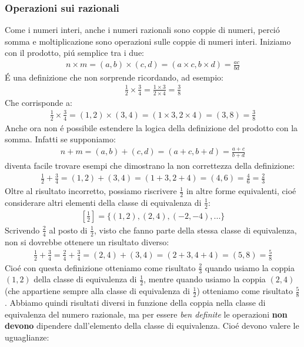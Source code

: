 \documentclass[twoside]{article} %
\begin{document}
	\subsubsection{Operazioni sui razionali}
		Come i numeri interi, anche i numeri razionali sono coppie di numeri, perci\'o   somma e moltiplicazione sono operazioni sulle coppie di numeri  interi. Iniziamo con il prodotto, pi\'u semplice tra i due:
		\begin{gather*}
			n\times m= (a,b)\times (c,d)=(a\times c,b\times d)= \frac{ac}{bd}
		\end{gather*}
		\'E una definizione che non sorprende ricordando, ad esempio:
		\begin{gather*}
			\frac{1}{2}\times \frac{3}{4}=\frac{1\times 3}{2\times 4}=\frac{3}{8}
		\end{gather*}
		Che corrisponde a:
		\begin{gather*}
			\frac{1}{2}\times \frac{3}{4}= (1,2)\times (3,4)=(1\times 3,2\times 4)=(3,8)=\frac{3}{8}
		\end{gather*}
		Anche ora non \'e possibile estendere la logica della definizione del prodotto  con la somma. Infatti se supponiamo:
		\begin{gather*}
			n+m= (a,b)+(c,d)=(a+c,b+d)= \frac{a+c}{b+d}
		\end{gather*}
		diventa facile trovare esempi che dimostrano la non correttezza della definizione:
		\begin{gather*}
			\frac{1}{2}+ \frac{3}{4}= (1,2)+(3,4)=(1+3,2+4)=(4,6)=\frac{4}{6}=\frac{2}{3}
		\end{gather*}
		\newpage
		\noindent Oltre al risultato incorretto, possiamo riscrivere $\frac{1}{2}$ in altre forme equivalenti, cio\'e considerare altri elementi della classe di equivalenza di $\frac{1}{2}$:
		\begin{gather*}
			\left[\frac{1}{2}\right]=\Big\{(1,2), (2,4), (-2,-4),...\Big\}
		\end{gather*}
		Scrivendo $\frac{2}{4}$ al posto di $\frac{1}{2}$, visto che fanno parte della stessa classe di equivalenza, non si dovrebbe ottenere un risultato diverso:
		\begin{gather*}
			\frac{1}{2}+ \frac{3}{4}= \frac{2}{4}+ \frac{3}{4}= (2,4)+(3,4)=(2+3,4+4)=(5,8)=\frac{5}{8}
		\end{gather*}
		Cio\'e con questa definizione otteniamo come risultato $\frac{2}{3}$ quando usiamo la coppia $(1,2)$ della classe di equivalenza di $\frac{1}{2}$, mentre quando usiamo la coppia $(2,4)$ (che appartiene sempre alla classe di equivalenza di $\frac{1}{2}$) otteniamo come risultato $\frac{5}{8}$. Abbiamo quindi risultati diversi in funzione della coppia nella classe di equivalenza del numero razionale, ma per essere \textit{ben definite} le operazioni \textbf{non devono} dipendere dall'elemento della classe di equivalenza. Cio\'e devono valere le uguaglianze:
\end{document}
